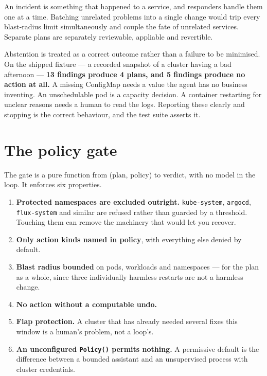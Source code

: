 \documentclass[11pt,a4paper]{article}
\newcommand{\code}[1]{\texttt{\small #1}}
\begin{document}
An incident is something that happened to a service, and responders handle them
one at a time. Batching unrelated problems into a single change would trip every
blast-radius limit simultaneously and couple the fate of unrelated services.
Separate plans are separately reviewable, appliable and revertible.

Abstention is treated as a correct outcome rather than a failure to be minimised.
On the shipped fixture --- a recorded snapshot of a cluster having a bad
afternoon --- \textbf{13 findings produce 4 plans, and 5 findings produce no
action at all.} A missing ConfigMap needs a value the agent has no business
inventing. An unschedulable pod is a capacity decision. A container restarting
for unclear reasons needs a human to read the logs. Reporting these clearly and
stopping is the correct behaviour, and the test suite asserts it.

\section{The policy gate}

The gate is a pure function from (plan, policy) to verdict, with no model in the
loop. It enforces six properties.

\begin{enumerate}
  \item \textbf{Protected namespaces are excluded outright.} \code{kube-system}, \code{argocd}, \code{flux-system} and similar are refused rather than guarded by a threshold. Touching them can remove the machinery that would let you recover.
  \item \textbf{Only action kinds named in policy}, with everything else denied by default.
  \item \textbf{Blast radius bounded} on pods, workloads and namespaces --- for the plan as a whole, since three individually harmless restarts are not a harmless change.
  \item \textbf{No action without a computable undo.}
  \item \textbf{Flap protection.} A cluster that has already needed several fixes this window is a human's problem, not a loop's.
  \item \textbf{An unconfigured \code{Policy()} permits nothing.} A permissive default is the difference between a bounded assistant and an unsupervised process with cluster credentials.
\end{enumerate}
\end{document}
